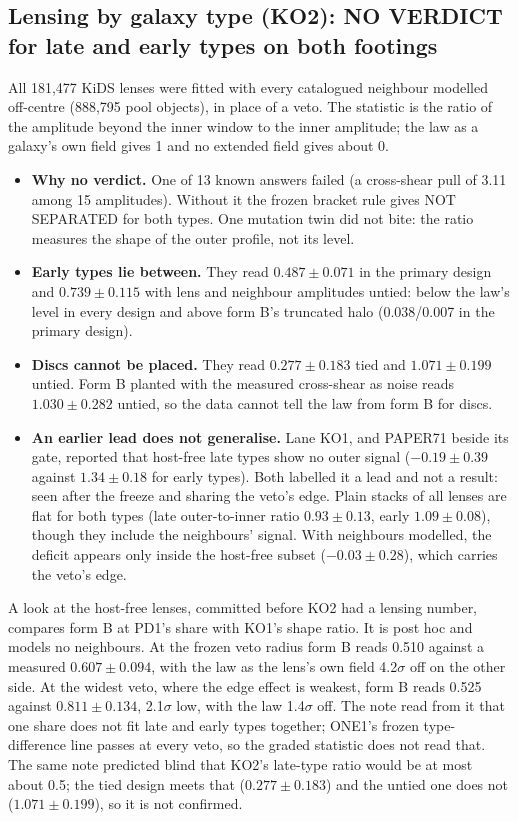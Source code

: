 \documentclass[10pt]{article}
\begin{document}
\subsection{Lensing by galaxy type (KO2): NO VERDICT for late and early types on both footings}
All 181,477 KiDS lenses were fitted with every catalogued neighbour modelled off-centre (888,795 pool objects), in place of a veto. The statistic is the ratio of the amplitude beyond the inner window to the inner amplitude; the law as a galaxy's own field gives 1 and no extended field gives about 0.
\begin{itemize}
\item \textbf{Why no verdict.} One of 13 known answers failed (a cross-shear pull of 3.11 among 15 amplitudes). Without it the frozen bracket rule gives NOT SEPARATED for both types. One mutation twin did not bite: the ratio measures the shape of the outer profile, not its level.
\item \textbf{Early types lie between.} They read $0.487\pm0.071$ in the primary design and $0.739\pm0.115$ with lens and neighbour amplitudes untied: below the law's level in every design and above form B's truncated halo (0.038/0.007 in the primary design).
\item \textbf{Discs cannot be placed.} They read $0.277\pm0.183$ tied and $1.071\pm0.199$ untied. Form B planted with the measured cross-shear as noise reads $1.030\pm0.282$ untied, so the data cannot tell the law from form B for discs.
\item \textbf{An earlier lead does not generalise.} Lane KO1, and PAPER71 beside its gate, reported that host-free late types show no outer signal ($-0.19\pm0.39$ against $1.34\pm0.18$ for early types). Both labelled it a lead and not a result: seen after the freeze and sharing the veto's edge. Plain stacks of all lenses are flat for both types (late outer-to-inner ratio $0.93\pm0.13$, early $1.09\pm0.08$), though they include the neighbours' signal. With neighbours modelled, the deficit appears only inside the host-free subset ($-0.03\pm0.28$), which carries the veto's edge.
\end{itemize}
A look at the host-free lenses, committed before KO2 had a lensing number, compares form B at PD1's share with KO1's shape ratio. It is post hoc and models no neighbours. At the frozen veto radius form B reads 0.510 against a measured $0.607\pm0.094$, with the law as the lens's own field 4.2$\sigma$ off on the other side. At the widest veto, where the edge effect is weakest, form B reads 0.525 against $0.811\pm0.134$, 2.1$\sigma$ low, with the law 1.4$\sigma$ off. The note read from it that one share does not fit late and early types together; ONE1's frozen type-difference line passes at every veto, so the graded statistic does not read that. The same note predicted blind that KO2's late-type ratio would be at most about 0.5; the tied design meets that ($0.277\pm0.183$) and the untied one does not ($1.071\pm0.199$), so it is not confirmed. 
\end{document}
